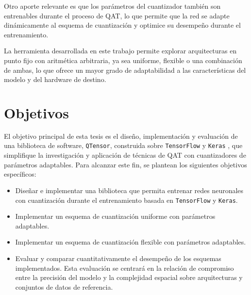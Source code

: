 Otro aporte relevante es que los parámetros del cuantizador también son entrenables durante el proceso de QAT, lo que permite que la red se adapte dinámicamente al esquema de cuantización y optimice su desempeño durante el entrenamiento.

La herramienta desarrollada en este trabajo permite explorar arquitecturas en punto fijo con aritmética arbitraria, ya sea uniforme, flexible o una combinación de ambas, lo que ofrece un mayor grado de adaptabilidad a las características del modelo y del hardware de destino.

\section{Objetivos}
\label{sec:objetivos}

El objetivo principal de esta tesis es el diseño, implementación y evaluación de una biblioteca de software, \texttt{QTensor}, construida sobre \texttt{TensorFlow} y \texttt{Keras} \cite{keras}, que simplifique la investigación y aplicación de técnicas de QAT con cuantizadores de parámetros adaptables.
Para alcanzar este fin, se plantean los siguientes objetivos específicos:

\begin{itemize}
    \item Diseñar e implementar una biblioteca que permita entrenar redes neuronales con cuantización durante el entrenamiento basada en \texttt{TensorFlow}  y \texttt{Keras}.
    \item Implementar un esquema de cuantización uniforme con parámetros adaptables.
    \item Implementar un esquema de cuantización flexible con parámetros adaptables.
    \item Evaluar y comparar cuantitativamente el desempeño de los esquemas implementados. Esta evaluación se centrará en la relación de compromiso entre la precisión del modelo y la complejidad espacial sobre arquitecturas y conjuntos de datos de referencia.
\end{itemize}
